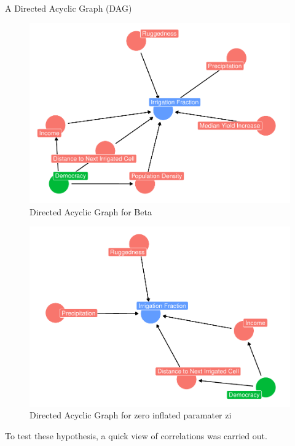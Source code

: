 \documentclass[12pt,twoside]{reedthesis}
\begin{document}
A Directed Acyclic Graph (DAG)
\begin{figure}

{\centering \includegraphics{thesis_files/figure-latex/mudag-1} 

}

\caption{Directed Acyclic Graph for Beta}\label{fig:mudag}
\end{figure}
\begin{figure}

{\centering \includegraphics{thesis_files/figure-latex/zidag-1} 

}

\caption{Directed Acyclic Graph for zero inflated paramater zi}\label{fig:zidag}
\end{figure}
To test these hypothesis, a quick view of correlations was carried out.
\end{document}
